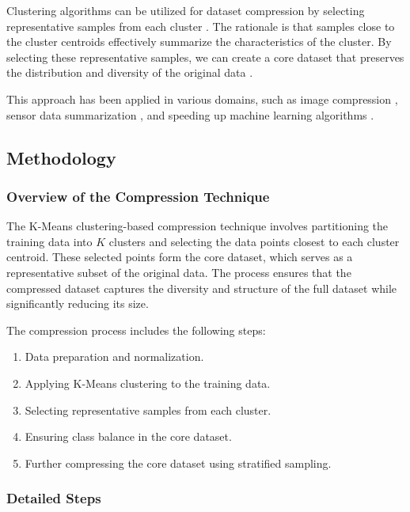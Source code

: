 \documentclass{article}
\begin{document}
Clustering algorithms can be utilized for dataset compression by selecting representative samples from each cluster \cite{leskovec2014mining}. The rationale is that samples close to the cluster centroids effectively summarize the characteristics of the cluster. By selecting these representative samples, we can create a core dataset that preserves the distribution and diversity of the original data \cite{aggarwal2013data}.

This approach has been applied in various domains, such as image compression \cite{gersho2012vector}, sensor data summarization \cite{hashemi2016clustering}, and speeding up machine learning algorithms \cite{bachem2018one}.

\subsection{Methodology}

\subsubsection{Overview of the Compression Technique}

The K-Means clustering-based compression technique involves partitioning the training data into $K$ clusters and selecting the data points closest to each cluster centroid. These selected points form the core dataset, which serves as a representative subset of the original data. The process ensures that the compressed dataset captures the diversity and structure of the full dataset while significantly reducing its size.

The compression process includes the following steps:

\begin{enumerate}
    \item Data preparation and normalization.
    \item Applying K-Means clustering to the training data.
    \item Selecting representative samples from each cluster.
    \item Ensuring class balance in the core dataset.
    \item Further compressing the core dataset using stratified sampling.
\end{enumerate}

\subsubsection{Detailed Steps}
\end{document}
